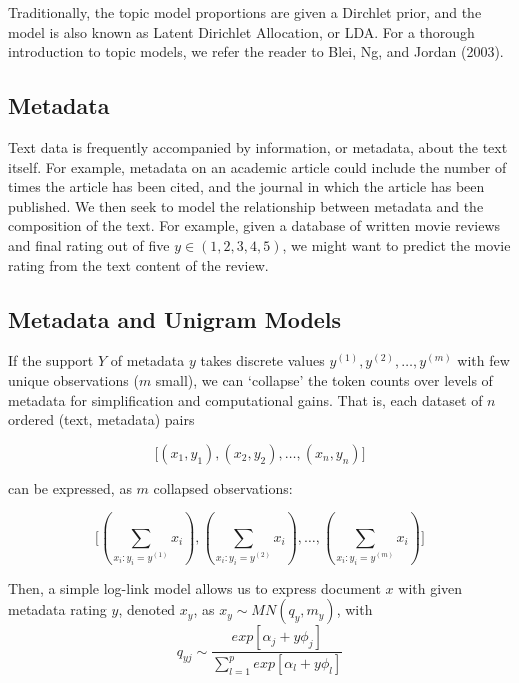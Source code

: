 \documentclass[12pt]{article}
\begin{document}
Traditionally, the topic model proportions are given a Dirchlet prior, and the model is also known as Latent Dirichlet Allocation, or LDA. 
For a thorough introduction to topic models, we refer the reader to Blei, Ng, and Jordan (2003). 

\subsection{Metadata}\label{metadata}

Text data is frequently accompanied by information, or metadata, about
the text itself. For example, metadata on an academic
article could include the number of times the article has been cited,
and the journal in which the article has been published. We then seek to model the relationship between metadata
and the composition of the text. For example, given a database of
written movie reviews and final rating out of five $y \in (1,2,3,4,5)$,
we might want to predict the movie rating from the text content of the review.

\subsection{Metadata and Unigram Models}

If the support $Y$ of metadata $y$ takes discrete values $y^{(1)}, y^{(2)}, \dots, y^{(m)}$ with few unique observations ($m$ small), we can `collapse' the token counts over levels of metadata for simplification and computational gains.  That is, each dataset of $n$ ordered (text, metadata) pairs

\begin{equation}
\big[ (x_1,y_1), (x_2,y_2), \dots , (x_n,y_n) \big]
\end{equation}

can be expressed, as $m$ collapsed observations:

\begin{equation}
\big[  (\sum_{x_i : y_i = y^{(1)}}{x_i}) , (\sum_{x_i : y_i = y^{(2)}}{x_i}), \dots,  (\sum_{x_i : y_i = y^{(m)}}{x_i})  \big]
\end{equation}

Then, a simple log-link model allows us to express document $x$ with given metadata rating $y$,
denoted $x_y$, as $x_y \sim MN(q_y,m_y)$, with
\begin{equation}
q_{yj} \sim \frac{exp[\alpha_j + y \phi_j]}{\sum_{l=1}^{p} exp[\alpha_l + y \phi_l]}
\end{equation}
\end{document}
